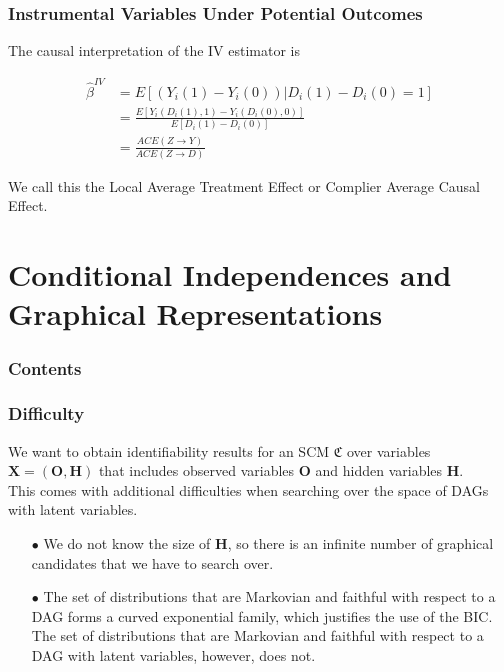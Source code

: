\documentclass{beamer}
\begin{document}
\begin{frame}
    \frametitle{Instrumental Variables Under Potential Outcomes}
    \begin{flushleft}
        The causal interpretation of the IV estimator is
    \end{flushleft}
    \begin{align*}
        \hat{\beta}^{IV}&= E[(Y_i(1)-Y_i(0))|D_i(1)-D_i(0)=1] \\
                        &= \frac{E[Y_i(D_i(1),1)-Y_i(D_i(0),0)]}{E[D_i(1)-D_i(0)]} \\
                        &= \frac{ACE(Z\rightarrow Y)}{ACE(Z\rightarrow D)}
    \end{align*}
    \begin{flushleft}
        We call this the Local Average Treatment Effect or Complier Average Causal Effect.
    \end{flushleft}
\end{frame}

\section{Conditional Independences and Graphical Representations}

\begin{frame}
    \frametitle{Contents}
    \tableofcontents[currentsection]
\end{frame}

\begin{frame}
    \frametitle{Difficulty}
    \begin{flushleft}
        We want to obtain identifiability results for an SCM $\mathfrak{C}$ over variables $\textbf{X}=(\textbf{O},\textbf{H})$ 
        that includes observed variables $\textbf{O}$ and hidden variables $\textbf{H}$. \\ 
        This comes with additional difficulties when searching over the space of DAGs with latent variables. 
    \end{flushleft}
    \begin{itemize}
        \item[$\bullet$] We do not know the size of $\textbf{H}$, so there is an infinite number of graphical candidates
        that we have to search over.
        \item[$\bullet$] The set of distributions that are Markovian and faithful with respect to
        a DAG forms a curved exponential family, which justifies the use of the BIC. The set of distributions that are Markovian 
        and faithful with respect to a DAG with latent variables, however, does not.
    \end{itemize}
\end{frame}
\end{document}
